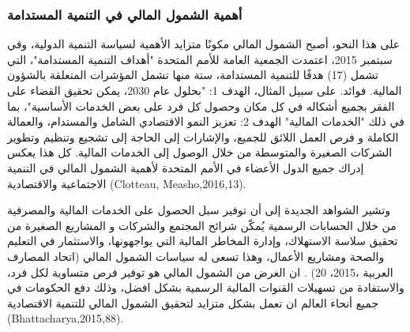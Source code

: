 \documentclass[10pt,a4paper]{report}
\begin{document}
\begin{doublespacing}
\subsubsection{أهمية الشمول المالي في التنمية المستدامة }
على هذا النحو، أصبح الشمول المالي مكونًا متزايد الأهمية لسياسة التنمية الدولية، وفي سبتمبر 2015، اعتمدت الجمعية العامة للأمم المتحدة "أهداف التنمية المستدامة"، التي تشمل (17) هدفًا للتنمية المستدامة، ستة منها تشمل المؤشرات المتعلقة بالشؤون المالية. فوائد. على سبيل المثال، الهدف 1: "بحلول عام 2030، يمكن تحقيق القضاء على الفقر بجميع أشكاله في كل مكان وحصول كل فرد على بعض الخدمات الأساسية"، بما في ذلك "الخدمات المالية" الهدف 2: تعزيز النمو الاقتصادي الشامل والمستدام، والعمالة الكاملة و فرص العمل اللائق للجميع، والإشارات إلى الحاجة إلى تشجيع وتنظيم وتطوير الشركات الصغيرة والمتوسطة من خلال الوصول إلى الخدمات المالية. كل هذا يعكس إدراك جميع الدول الأعضاء في الأمم المتحدة لأهمية الشمول المالي في التنمية الاجتماعية والاقتصادية (Clotteau, Measho,2016,13).

وتشير الشواهد الجديدة إلى أن توفير سبل الحصول على الخدمات المالية والمصرفية من خلال الحسابات الرسمية يُمكّن شرائح المجتمع والشركات و المشاريع الصغيرة من تحقيق سلاسة الاستهلاك، وإدارة المخاطر المالية التي يواجهونها، والاستثمار في التعليم والصحة ومشاريع الأعمال، وهذا تسعى له سياسات الشمول المالي (اتحاد المصارف العربية ،2015، 20) .
ان الغرض من الشمول المالي هو توفير فرص متساوية لكل فرد،  والاستفادة من تسهيلات القنوات المالية الرسمية بشكل افضل،  وذلك دفع الحكومات في جميع أنحاء العالم ان تعمل بشكل متزايد لتحقيق الشمول المالي للتنمية الاقتصادية (Bhattacharya,2015,88). 


\end{doublespacing}
\end{document}
